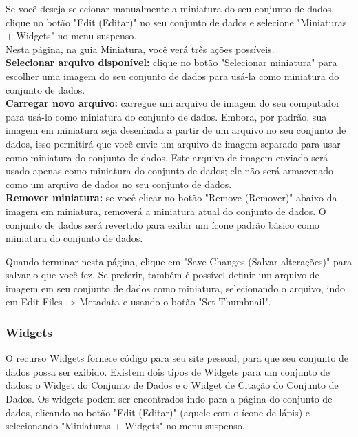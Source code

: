 \documentclass[12pt,hidelinks]{article}
\begin{document}
Se você deseja selecionar manualmente a miniatura do seu conjunto de dados, clique no botão "Edit (Editar)" no seu conjunto de dados e selecione "Miniaturas + Widgets" no menu suspenso.\\

Nesta página, na guia Miniatura, você verá três ações possíveis.\\

\textbf{Selecionar arquivo disponível:} clique no botão "Selecionar miniatura" para \\escolher uma imagem do seu conjunto de dados para usá-la como miniatura do conjunto de dados.\\

\textbf{Carregar novo arquivo:} carregue um arquivo de imagem do seu computador para usá-lo como miniatura do conjunto de dados. Embora, por padrão, sua imagem em miniatura seja desenhada a partir de um arquivo no seu conjunto de dados, isso permitirá que você envie um arquivo de imagem separado para usar como miniatura do conjunto de dados. Este arquivo de imagem enviado será usado apenas como miniatura do conjunto de dados; ele não será armazenado como um arquivo de dados no seu conjunto de dados.\\

\textbf{Remover miniatura:} se você clicar no botão "Remove (Remover)" abaixo da imagem em miniatura, removerá a miniatura atual do conjunto de dados. O conjunto de dados será revertido para exibir um ícone padrão básico como miniatura do conjunto de dados.

Quando terminar nesta página, clique em "Save Changes (Salvar alterações)" para salvar o que você fez. Se preferir, também é possível definir um arquivo de imagem em seu conjunto de dados como miniatura, selecionando o arquivo, indo em Edit Files -> Metadata e usando o botão "Set Thumbnail".
        
        \subsubsection{Widgets}
        
\qquad O recurso Widgets fornece código para seu site pessoal, para que seu conjunto de dados possa ser exibido. Existem dois tipos de Widgets para um conjunto de dados: o Widget do Conjunto de Dados e o Widget de Citação do Conjunto de Dados. Os widgets podem ser encontrados indo para a página do conjunto de dados, clicando no botão "Edit (Editar)" (aquele com o ícone de lápis) e selecionando "Miniaturas + Widgets" no menu suspenso.
\end{document}
